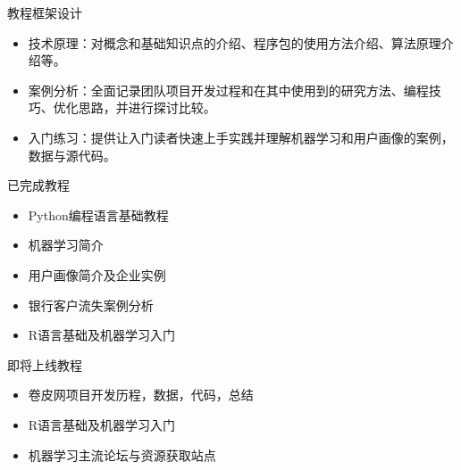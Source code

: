 \documentclass[10pt]{beamer}
\begin{document}
\begin{frame}{教程框架设计}
\begin{itemize}
\item 技术原理：对概念和基础知识点的介绍、程序包的使用方法介绍、算法原理介绍等。\newline
\item 案例分析：全面记录团队项目开发过程和在其中使用到的研究方法、编程技巧、优化思路，并进行探讨比较。\newline
\item 入门练习：提供让入门读者快速上手实践并理解机器学习和用户画像的案例，数据与源代码。\newline
\end{itemize}
\end{frame}

\begin{frame}{已完成教程}
  \begin{itemize}
    \item Python编程语言基础教程\newline
    \item 机器学习简介\newline
    \item 用户画像简介及企业实例\newline
    \item 银行客户流失案例分析\newline
    \item R语言基础及机器学习入门\newline
  \end{itemize}
\end{frame}

\begin{frame}{即将上线教程}
  \begin{itemize}
    \item 卷皮网项目开发历程，数据，代码，总结\newline
    \item R语言基础及机器学习入门\newline
    \item 机器学习主流论坛与资源获取站点
  \end{itemize}
\end{frame}
\end{document}
